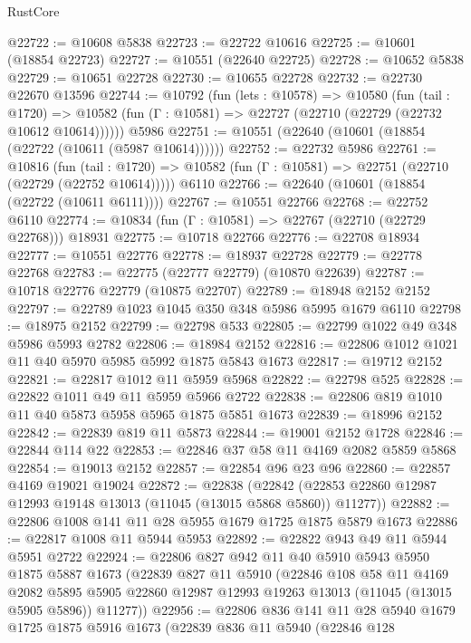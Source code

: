 \begin{lexlean}{RustCore}
\begin{coremodule}
@22722 := @10608 @5838
@22723 := @22722 @10616
@22725 := @10601 (@18854 @22723)
@22727 := @10551 (@22640 @22725)
@22728 := @10652 @5838
@22729 := @10651 @22728
@22730 := @10655 @22728
@22732 := @22730 @22670 @13596
@22744 := @10792
    (fun (lets : @10578) =>
    @10580
      (fun (tail : @1720) =>
      @10582 (fun (Γ : @10581) => @22727 (@22710 (@22729 (@22732 @10612 @10614))))))
    @5986
@22751 := @10551 (@22640 (@10601 (@18854 (@22722 (@10611 (@5987 @10614))))))
@22752 := @22732 @5986
@22761 := @10816
    (fun (tail : @1720) => @10582 (fun (Γ : @10581) => @22751 (@22710 (@22729 (@22752 @10614)))))
    @6110
@22766 := @22640 (@10601 (@18854 (@22722 (@10611 @6111))))
@22767 := @10551 @22766
@22768 := @22752 @6110
@22774 := @10834 (fun (Γ : @10581) => @22767 (@22710 (@22729 @22768))) @18931
@22775 := @10718 @22766
@22776 := @22708 @18934
@22777 := @10551 @22776
@22778 := @18937 @22728
@22779 := @22778 @22768
@22783 := @22775 (@22777 @22779) (@10870 @22639)
@22787 := @10718 @22776 @22779 (@10875 @22707)
@22789 := @18948 @2152 @2152
@22797 := @22789 @1023 @1045 @350 @348 @5986 @5995 @1679 @6110
@22798 := @18975 @2152
@22799 := @22798 @533
@22805 := @22799 @1022 @49 @348 @5986 @5993 @2782
@22806 := @18984 @2152
@22816 := @22806 @1012 @1021 @11 @40 @5970 @5985 @5992 @1875 @5843 @1673
@22817 := @19712 @2152
@22821 := @22817 @1012 @11 @5959 @5968
@22822 := @22798 @525
@22828 := @22822 @1011 @49 @11 @5959 @5966 @2722
@22838 := @22806 @819 @1010 @11 @40 @5873 @5958 @5965 @1875 @5851 @1673
@22839 := @18996 @2152
@22842 := @22839 @819 @11 @5873
@22844 := @19001 @2152 @1728
@22846 := @22844 @114 @22
@22853 := @22846 @37 @58 @11 @4169 @2082 @5859 @5868
@22854 := @19013 @2152
@22857 := @22854 @96 @23 @96
@22860 := @22857 @4169 @19021 @19024
@22872 := @22838
    (@22842 (@22853 @22860 @12987 @12993 @19148 @13013 (@11045 (@13015 @5868 @5860)) @11277))
@22882 := @22806 @1008 @141 @11 @28 @5955 @1679 @1725 @1875 @5879 @1673
@22886 := @22817 @1008 @11 @5944 @5953
@22892 := @22822 @943 @49 @11 @5944 @5951 @2722
@22924 := @22806
    @827
    @942
    @11
    @40
    @5910
    @5943
    @5950
    @1875
    @5887
    @1673
    (@22839
      @827
      @11
      @5910
      (@22846
        @108
        @58
        @11
        @4169
        @2082
        @5895
        @5905
        @22860
        @12987
        @12993
        @19263
        @13013
        (@11045 (@13015 @5905 @5896))
        @11277))
@22956 := @22806
    @836
    @141
    @11
    @28
    @5940
    @1679
    @1725
    @1875
    @5916
    @1673
    (@22839
      @836
      @11
      @5940
      (@22846
        @128

\end{coremodule}
\end{lexlean}
